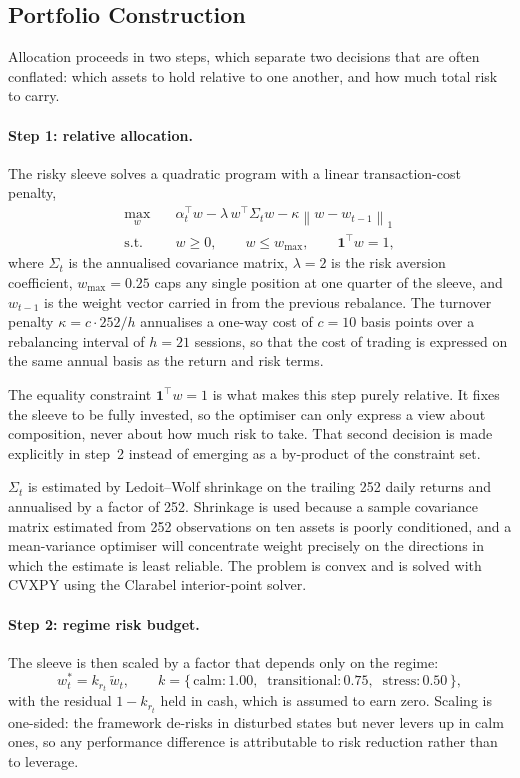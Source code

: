 \subsection{Portfolio Construction}

Allocation proceeds in two steps, which separate two decisions that are often conflated:
which assets to hold relative to one another, and how much total risk to carry.

\paragraph{Step 1: relative allocation.} The risky sleeve solves a quadratic program
with a linear transaction-cost penalty,
\begin{align}
\max_{w} \quad & \alpha_t^{\top} w - \lambda \, w^{\top} \Sigma_t w
- \kappa \left\| w - w_{t-1} \right\|_1 \\
\text{s.t.} \quad & w \geq 0, \qquad w \leq w_{\max}, \qquad \mathbf{1}^{\top} w = 1,
\end{align}
where $\Sigma_t$ is the annualised covariance matrix, $\lambda = 2$ is the risk
aversion coefficient, $w_{\max} = 0.25$ caps any single position at one quarter of the
sleeve, and $w_{t-1}$ is the weight vector carried in from the previous rebalance. The
turnover penalty $\kappa = c \cdot 252 / h$ annualises a one-way cost of $c = 10$ basis
points over a rebalancing interval of $h = 21$ sessions, so that the cost of trading is
expressed on the same annual basis as the return and risk terms.

The equality constraint $\mathbf{1}^{\top} w = 1$ is what makes this step purely
relative. It fixes the sleeve to be fully invested, so the optimiser can only express a
view about composition, never about how much risk to take. That second decision is made
explicitly in step~2 instead of emerging as a by-product of the constraint set.

$\Sigma_t$ is estimated by Ledoit--Wolf shrinkage \citep{ledoit04} on the trailing 252
daily returns and annualised by a factor of 252. Shrinkage is used because a sample
covariance matrix estimated from 252 observations on ten assets is poorly conditioned,
and a mean-variance optimiser will concentrate weight precisely on the directions in
which the estimate is least reliable. The problem is convex and is solved with CVXPY
using the Clarabel interior-point solver.

\paragraph{Step 2: regime risk budget.} The sleeve is then scaled by a factor that
depends only on the regime:
\begin{equation}
w^{\ast}_t = k_{r_t} \, \tilde{w}_t, \qquad
k = \{\,\text{calm}: 1.00, \;\; \text{transitional}: 0.75, \;\; \text{stress}: 0.50\,\},
\label{eq:budget}
\end{equation}
with the residual $1 - k_{r_t}$ held in cash, which is assumed to earn zero. Scaling is
one-sided: the framework de-risks in disturbed states but never levers up in calm ones,
so any performance difference is attributable to risk reduction rather than to leverage.

